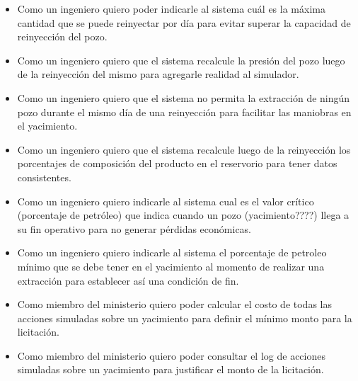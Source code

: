 \begin{itemize}
  \item Como un ingeniero quiero poder indicarle al sistema cuál es la máxima cantidad que se puede reinyectar por día para evitar superar la capacidad de reinyección del pozo.
  \item Como un ingeniero quiero que el sistema recalcule la presión del pozo luego de la reinyección del mismo para agregarle realidad al simulador.
  \item Como un ingeniero quiero que el sistema no permita la extracción de ningún pozo durante el mismo día de una reinyección para facilitar las maniobras en el yacimiento.
  \item Como un ingeniero quiero que el sistema recalcule luego de la reinyección los porcentajes de composición del producto en el reservorio para tener datos consistentes.
  \item Como un ingeniero quiero indicarle al sistema cual es el valor crítico (porcentaje de petróleo) que indica cuando un pozo (yacimiento????) llega a su fin operativo para no generar pérdidas económicas.
  \item Como un ingeniero quiero indicarle al sistema el porcentaje de petroleo mínimo que se debe tener en el yacimiento al momento de realizar una extracción para establecer así una condición de fin.
  \item Como miembro del ministerio quiero poder calcular el costo de todas las acciones simuladas sobre un yacimiento para definir el mínimo monto para la licitación.
  \item Como miembro del ministerio quiero poder consultar el log de acciones simuladas sobre un yacimiento para justificar el monto de la licitación.
\end{itemize}
